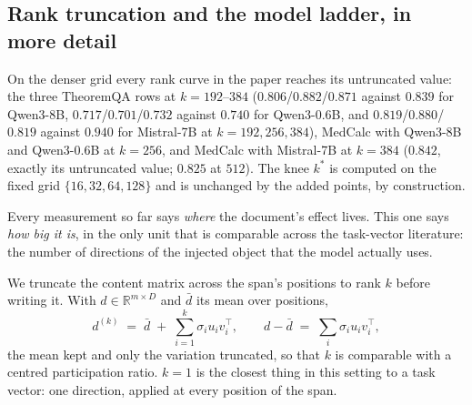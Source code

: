 \documentclass{article}
\newcommand{\dvec}{\ensuremath{d}}
\begin{document}
\begin{table}[h]
\caption{The channel and the truncation curve at three model widths, each with
its own restricted split and its own injection layer at matched relative depth.
$\rho$ is Eq.~\ref{eq:rho}; \emph{gold} is what the document itself is worth on
that model's restricted items, which is why the $0.6$B and $1.7$B rows have low
absolute accuracy and a large $n$: those models solve almost nothing without the
document, so almost every item qualifies. Qwen3-0.6B and Qwen3-8B are after the
instrument fix; Qwen3-1.7B is before it, and its curve is not monotone, so its
$k^{*}$ is not interpretable. $k^{*}$ sits between $32$ and $64$ at $d=1024$
and at $d=4096$ alike; a width-proportional account predicts $k\approx12$ for
the first. Mistral-7B is in Table~\ref{tab:replicationfull}.}
\label{tab:laddermodels}
\centering
\footnotesize
\setlength{\tabcolsep}{3pt}

\end{table}

\subsection{Rank truncation and the model ladder, in more detail}
\label{app:rank2}

On the denser grid every rank curve in the paper reaches its untruncated value:
the three TheoremQA rows at $k=192$--$384$ ($0.806$/$0.882$/$0.871$ against
$0.839$ for Qwen3-8B, $0.717$/$0.701$/$0.732$ against $0.740$ for Qwen3-0.6B,
and $0.819$/$0.880$/$0.819$ against $0.940$ for Mistral-7B at $k=192,256,384$),
MedCalc with Qwen3-8B and Qwen3-0.6B at $k=256$, and MedCalc with Mistral-7B at
$k=384$ ($0.842$, exactly its untruncated value; $0.825$ at $512$). The knee
$k^{*}$ is computed on the fixed grid $\{16,32,64,128\}$ and is unchanged by
the added points, by construction.

Every measurement so far says \emph{where} the document's effect lives. This one
says \emph{how big it is}, in the only unit that is comparable across the
task-vector literature: the number of directions of the injected object that the
model actually uses.

We truncate the content matrix across the span's positions to rank $k$ before
writing it. With $\dvec \in \mathbb{R}^{m \times D}$ and $\bar{\dvec}$ its mean
over positions,
\begin{equation}
\dvec^{(k)} \;=\; \bar{\dvec} \;+\; \sum_{i=1}^{k} \sigma_i u_i v_i^{\top},
\qquad
\dvec - \bar{\dvec} \;=\; \textstyle\sum_i \sigma_i u_i v_i^{\top},
\end{equation}
the mean kept and only the variation truncated, so that $k$ is comparable with a
centred participation ratio. $k=1$ is the closest thing in this setting to a
task vector: one direction, applied at every position of the span.
\end{document}
